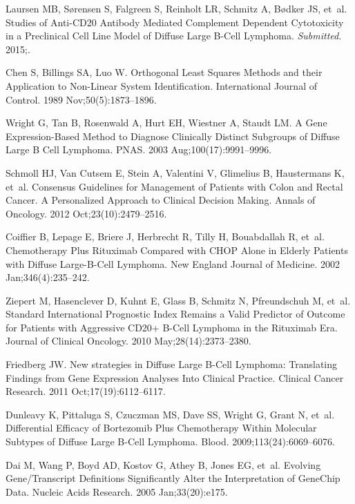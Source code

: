 \documentclass[10pt,letterpaper]{article}
\begin{document}
\begin{thebibliography}{10}
Laursen MB, S{\o}rensen S, Falgreen S, Reinholt LR, Schmitz A, B{\o}dker JS,
  et~al.
\newblock Studies of Anti-{CD20} Antibody Mediated Complement Dependent
  Cytotoxicity in a Preclinical Cell Line Model of Diffuse Large {B}-Cell
  Lymphoma.
\newblock \textit{Submitted}. 2015;.

Chen S, Billings SA, Luo W.
\newblock Orthogonal Least Squares Methods and their Application to Non-Linear
  System Identification.
\newblock International Journal of Control. 1989 Nov;50(5):1873--1896.

Wright G, Tan B, Rosenwald A, Hurt EH, Wiestner A, Staudt LM.
\newblock A Gene Expression-Based Method to Diagnose Clinically Distinct
  Subgroups of Diffuse Large {B} Cell Lymphoma.
\newblock PNAS. 2003 Aug;100(17):9991--9996.

Schmoll HJ, {Van Cutsem} E, Stein A, Valentini V, Glimelius B, Haustermans K,
  et~al.
 Consensus Guidelines for Management of Patients with Colon and
  Rectal Cancer. {A} Personalized Approach to Clinical Decision Making.
\newblock Annals of Oncology. 2012 Oct;23(10):2479--2516.

Coiffier B, Lepage E, Briere J, Herbrecht R, Tilly H, Bouabdallah R, et~al.
 Chemotherapy Plus Rituximab Compared with {CHOP} Alone in
  Elderly Patients with Diffuse Large-{B}-Cell Lymphoma.
\newblock New England Journal of Medicine. 2002 Jan;346(4):235--242.

Ziepert M, Hasenclever D, Kuhnt E, Glass B, Schmitz N, Pfreundschuh M, et~al.
\newblock Standard International Prognostic Index Remains a Valid Predictor of
  Outcome for Patients with Aggressive {CD20+} {B}-Cell Lymphoma in the
  Rituximab Era.
\newblock Journal of Clinical Oncology. 2010 May;28(14):2373--2380.

Friedberg JW.
\newblock New strategies in Diffuse Large {B}-Cell Lymphoma: Translating
  Findings from Gene Expression Analyses Into Clinical Practice.
\newblock Clinical Cancer Research. 2011 Oct;17(19):6112--6117.

Dunleavy K, Pittaluga S, Czuczman MS, Dave SS, Wright G, Grant N, et~al.
\newblock Differential Efficacy of Bortezomib Plus Chemotherapy Within
  Molecular Subtypes of Diffuse Large {B}-Cell Lymphoma.
\newblock Blood. 2009;113(24):6069--6076.

Dai M, Wang P, Boyd AD, Kostov G, Athey B, Jones EG, et~al.
\newblock Evolving {Gene/Transcript} Definitions Significantly Alter the
  Interpretation of {GeneChip} Data.
\newblock Nucleic Acids Research. 2005 Jan;33(20):e175.


\end{thebibliography}
\end{document}
